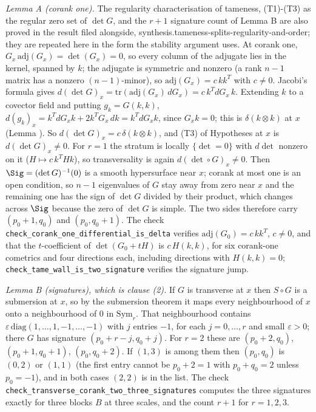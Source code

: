\emph{Lemma A (corank one).} The regularity characterisation of tameness, (T1)-(T3) as the regular zero set of $\det G$, and the $r + 1$ signature count of Lemma B are also proved in the result filed alongside, synthesis.tameness-splits-regularity-and-order; they are repeated here in the form the stability argument uses. At corank one, $G_x\,\mathrm{adj}(G_x) = \det(G_x) = 0$, so every column of the adjugate lies in the kernel, spanned by $k$; the adjugate is symmetric and nonzero (a rank $n-1$ matrix has a nonzero $(n-1)$-minor), so $\mathrm{adj}(G_x) = c\,k k^{T}$ with $c \neq 0$. Jacobi's formula gives $d(\det G)_x = \mathrm{tr}(\mathrm{adj}(G_x)\, dG_x) = c\, k^{T} dG_x\, k$. Extending $k$ to a covector field and putting $g_k = G(k,k)$, $d(g_k)_x = k^{T} dG_x k + 2 k^{T} G_x\, dk = k^{T} dG_x k$, since $G_x k = 0$; this is $\delta(k \otimes k)$ at $x$ (Lemma ). So $d(\det G)_x = c\,\delta(k \otimes k)$, and (T3) of Hypotheses  at $x$ is $d(\det G)_x \neq 0$. For $r = 1$ the stratum is locally $\{\det = 0\}$ with $d\det$ nonzero on it ($H \mapsto c\,k^{T} H k$), so transversality is again $d(\det \circ G)_x \neq 0$. Then $\Sig = (\det G)^{-1}(0)$ is a smooth hypersurface near $x$; corank at most one is an open condition, so $n - 1$ eigenvalues of $G$ stay away from zero near $x$ and the remaining one has the sign of $\det G$ divided by their product, which changes across $\Sig$ because the zero of $\det G$ is simple. The two sides therefore carry $(p_0 + 1, q_0)$ and $(p_0, q_0 + 1)$. The check \texttt{check\_corank\_one\_differential\_is\_delta} verifies $\mathrm{adj}(G_0) = c\,kk^{T}$, $c \neq 0$, and that the $t$-coefficient of $\det(G_0 + tH)$ is $c\,H(k,k)$, for six corank-one cometrics and four directions each, including directions with $H(k,k) = 0$; \texttt{check\_tame\_wall\_is\_two\_signature} verifies the signature jump.

\emph{Lemma B (signatures), which is clause (2).} If $G$ is transverse at $x$ then $S \circ G$ is a submersion at $x$, so by the submersion theorem it maps every neighbourhood of $x$ onto a neighbourhood of $0$ in $\mathrm{Sym}_r$. That neighbourhood contains $\varepsilon\,\mathrm{diag}(1, \dots, 1, -1, \dots, -1)$ with $j$ entries $-1$, for each $j = 0, \dots, r$ and small $\varepsilon > 0$; there $G$ has signature $(p_0 + r - j, q_0 + j)$. For $r = 2$ these are $(p_0 + 2, q_0)$, $(p_0 + 1, q_0 + 1)$, $(p_0, q_0 + 2)$. If $(1,3)$ is among them then $(p_0, q_0)$ is $(0,2)$ or $(1,1)$ (the first entry cannot be $p_0 + 2 = 1$ with $p_0 + q_0 = 2$ unless $p_0 = -1$), and in both cases $(2,2)$ is in the list. The check \texttt{check\_transverse\_corank\_two\_three\_signatures} computes the three signatures exactly for three blocks $B$ at three scales, and the count $r + 1$ for $r = 1, 2, 3$.

